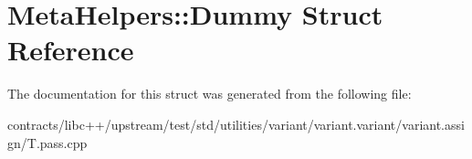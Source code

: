 \hypertarget{struct_meta_helpers_1_1_dummy}{}\section{Meta\+Helpers\+:\+:Dummy Struct Reference}
\label{struct_meta_helpers_1_1_dummy}


The documentation for this struct was generated from the following file\+:\begin{DoxyCompactItemize}
\item 
contracts/libc++/upstream/test/std/utilities/variant/variant.\+variant/variant.\+assign/T.\+pass.\+cpp\end{DoxyCompactItemize}
